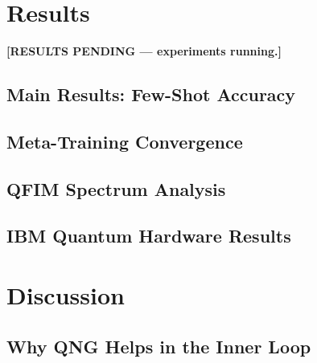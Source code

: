 \documentclass[a4paper,nopdfoutputerror]{quantumarticle}
\begin{document}
\section{Results}
\label{sec:results}

\textbf{[RESULTS PENDING — experiments running.]}


\subsection{Main Results: Few-Shot Accuracy}


\subsection{Meta-Training Convergence}


\subsection{QFIM Spectrum Analysis}


\subsection{IBM Quantum Hardware Results}


\section{Discussion}
\label{sec:discussion}

\subsection{Why QNG Helps in the Inner Loop}
\end{document}
